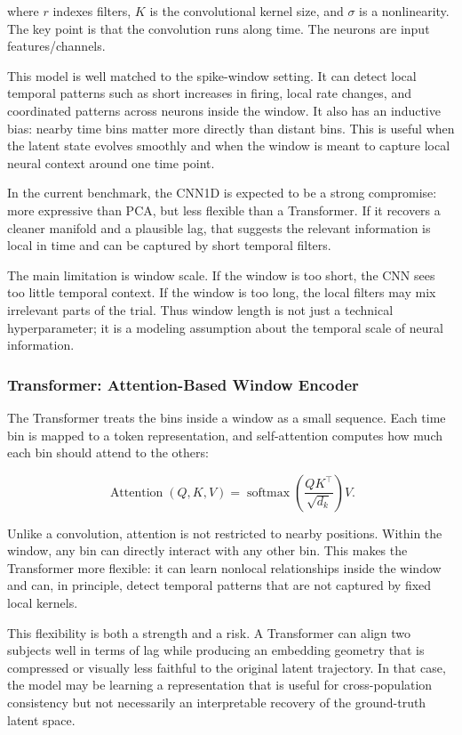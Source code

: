 \documentclass[11pt]{article}
\begin{document}
where $r$ indexes filters, $K$ is the convolutional kernel size, and $\sigma$
is a nonlinearity. The key point is that the convolution runs along time. The
neurons are input features/channels.

This model is well matched to the spike-window setting. It can detect local
temporal patterns such as short increases in firing, local rate changes, and
coordinated patterns across neurons inside the window. It also has an
inductive bias: nearby time bins matter more directly than distant bins. This
is useful when the latent state evolves smoothly and when the window is meant
to capture local neural context around one time point.

In the current benchmark, the CNN1D is expected to be a strong compromise:
more expressive than PCA, but less flexible than a Transformer. If it recovers
a cleaner manifold and a plausible lag, that suggests the relevant information
is local in time and can be captured by short temporal filters.

The main limitation is window scale. If the window is too short, the CNN sees
too little temporal context. If the window is too long, the local filters may
mix irrelevant parts of the trial. Thus window length is not just a technical
hyperparameter; it is a modeling assumption about the temporal scale of neural
information.

\subsubsection{Transformer: Attention-Based Window Encoder}

The Transformer treats the bins inside a window as a small sequence. Each time
bin is mapped to a token representation, and self-attention computes how much
each bin should attend to the others:

\begin{equation}
\operatorname{Attention}(Q,K,V)
=
\operatorname{softmax}
\left(
\frac{QK^\top}{\sqrt{d_k}}
\right)V.
\end{equation}

Unlike a convolution, attention is not restricted to nearby positions. Within
the window, any bin can directly interact with any other bin. This makes the
Transformer more flexible: it can learn nonlocal relationships inside the
window and can, in principle, detect temporal patterns that are not captured by
fixed local kernels.

This flexibility is both a strength and a risk. A Transformer can align two
subjects well in terms of lag while producing an embedding geometry that is
compressed or visually less faithful to the original latent trajectory. In
that case, the model may be learning a representation that is useful for
cross-population consistency but not necessarily an interpretable recovery of
the ground-truth latent space.
\end{document}
